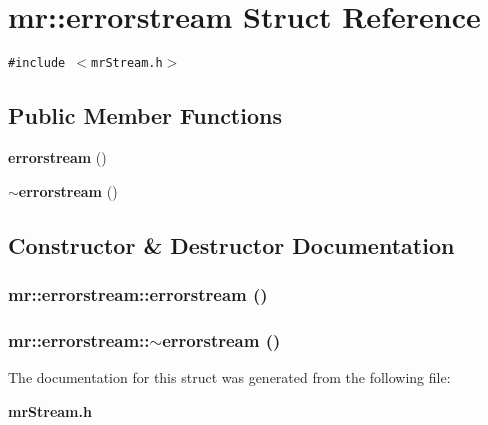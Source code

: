 \section{mr::errorstream Struct Reference}
\label{structmr_1_1errorstream}
{\tt \#include $<$mr\-Stream.h$>$}

\subsection*{Public Member Functions}
\begin{CompactItemize}
\item 
{\bf errorstream} ()
\item 
{\bf $\sim$errorstream} ()
\end{CompactItemize}


\subsection{Constructor \& Destructor Documentation}
\subsubsection{\setlength{\rightskip}{0pt plus 5cm}mr::errorstream::errorstream ()\hspace{0.3cm}{\tt  [inline]}}\label{structmr_1_1errorstream_a0}


\subsubsection{\setlength{\rightskip}{0pt plus 5cm}mr::errorstream::$\sim${\bf errorstream} ()\hspace{0.3cm}{\tt  [inline]}}\label{structmr_1_1errorstream_a1}




The documentation for this struct was generated from the following file:\begin{CompactItemize}
\item 
{\bf mr\-Stream.h}\end{CompactItemize}
